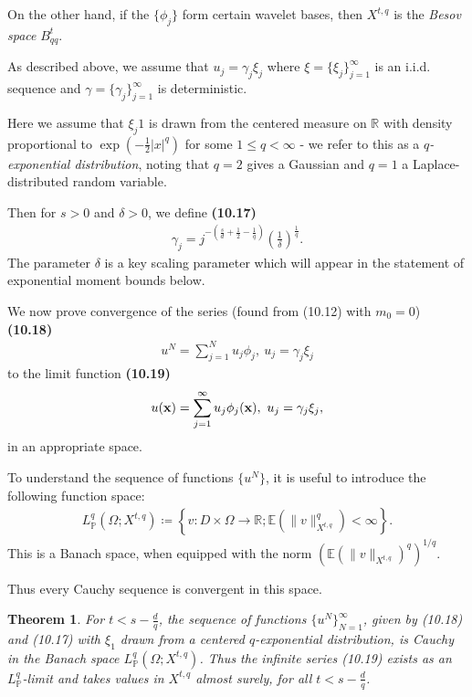 \documentclass[oneside,11pt]{book}
\numberwithin{equation}{section}
\newtheorem{theorem}{Theorem}[section]
\begin{document}
On the other hand, if the $\{\phi_j\}$ form certain wavelet bases, then $X^{t,q}$ is the \textit{Besov space} $B_{qq}^t$.

%
As described above, we assume that $u_j = \gamma_j\xi_j$ where $\xi = \{\xi_j\}_{j=1}^\infty$ is an i.i.d. sequence and $\gamma = \{\gamma_j\}_{j=1}^\infty$ is deterministic.

Here we assume that $\xi_j1$ is drawn from the centered measure on $\mathbb{R}$ with density proportional to $\exp\left(-\frac{1}{2}|x|^q\right)$ for some $1\le q < \infty$ - we refer to this as a \textit{$q$-exponential distribution}, noting that $q = 2$ gives a Gaussian and $q = 1$ a Laplace-distributed random variable.

Then for $s > 0$ and $\delta > 0$, we define \textbf{(10.17)}
\begin{align*}
    \gamma_j = j^{-\left(\frac{s}{d} + \frac{1}{2} - \frac{1}{q}\right)}\left(\frac{1}{\delta}\right)^{\frac{1}{q}}.
\end{align*}
The parameter $\delta$ is a key scaling parameter which will appear in the statement of exponential moment bounds below.

%
We now prove convergence of the series (found from (10.12) with $m_0 = 0$) \textbf{(10.18)}
\begin{align*}
    u^N = \sum_{j=1}^N u_j\phi_j,\ u_j = \gamma_j\xi_j
\end{align*}
to the limit function \textbf{(10.19)}
\begin{align*}
    u({\bf x}) = \sum_{j=1}^\infty u_j\phi_j({\bf x}),\ u_j = \gamma_j\xi_j,
\end{align*}
in an appropriate space.

To understand the sequence of functions $\{u^N\}$, it is useful to introduce the following function space:
\begin{align*}
    L_{\mathbb{P}}^q(\Omega;X^{t,q})\coloneqq\left\{v:D\times\Omega\to\mathbb{R};\mathbb{E}(\|v\|_{X^{t,q}}^q) < \infty\right\}.
\end{align*}
This is a Banach space, when equipped with the norm $(\mathbb{E}(\|v\|_{X^{t,q}})^q)^{1/q}$.

Thus every Cauchy sequence is convergent in this space.

\begin{theorem}
    For $t < s - \frac{d}{q}$, the sequence of functions $\{u^N\}_{N=1}^\infty$, given by (10.18) and (10.17) with $\xi_1$ drawn from a centered $q$-exponential distribution, is Cauchy in the Banach space $L_{\mathbb{P}}^q(\Omega;X^{t,q})$. Thus the infinite series (10.19) exists as an $L_{\mathbb{P}}^q$-limit and takes values in $X^{t,q}$ almost surely, for all $t < s - \frac{d}{q}$.
\end{theorem}
\end{document}
